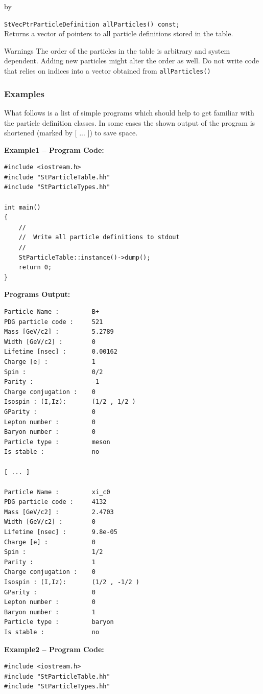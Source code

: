 \documentclass[twoside]{article}
\newcommand{\comp}[1]{\texttt{#1}}%
\newcommand{\entrylabel}[1]{\mbox{\textbf{{#1}}}\hfil}%
\newenvironment{entry}
{\begin{list}{}%
    {\renewcommand{\makelabel}{\entrylabel}%
     \setlength{\labelwidth}{90pt}%
     \setlength{\leftmargin}{\labelwidth}
     \advance\leftmargin by \labelsep%
      }%
    }%
  {\end{list}}
\newcommand{\Entrylabel}[1]%
{\raisebox{0pt}[1ex][0pt]{\makebox[\labelwidth][l]%
    {\parbox[t]{\labelwidth}{\hspace{0pt}\textbf{{#1}}}}}}
\newenvironment{Entry}%
{\renewcommand{\entrylabel}{\Entrylabel}\begin{entry}}%
  {\end{entry}}
\begin{document}
\begin{description}
\begin{Entry}
    \verb+StVecPtrParticleDefinition allParticles() const;+\\
    Returns a vector of pointers to all particle definitions stored
    in the table.

\item[Warnings]
    The order of the particles in the table is arbitrary and
    system dependent. Adding new particles might alter
    the order as well. Do not write code that relies on indices
    into a vector obtained from \comp{allParticles()}
\end{Entry}

\subsubsection{Examples}
\label{sec:pex}
What follows is a list of simple programs which should help to get familiar
with the particle definition classes. In some cases the shown
output of the program is shortened (marked by [ ... ]) to save space.

{\footnotesize
{\bf Example1 -- Program Code:}  
\begin{verbatim}
#include <iostream.h>
#include "StParticleTable.hh"
#include "StParticleTypes.hh"

int main()
{
    //
    //  Write all particle definitions to stdout
    //
    StParticleTable::instance()->dump();
    return 0;
}
\end{verbatim}
{\bf Programs Output:}
\begin{verbatim}
Particle Name :         B+
PDG particle code :     521
Mass [GeV/c2] :         5.2789
Width [GeV/c2] :        0
Lifetime [nsec] :       0.00162
Charge [e] :            1
Spin :                  0/2
Parity :                -1
Charge conjugation :    0
Isospin : (I,Iz):       (1/2 , 1/2 ) 
GParity :               0
Lepton number :         0
Baryon number :         0
Particle type :         meson
Is stable :             no

[ ... ]

Particle Name :         xi_c0
PDG particle code :     4132
Mass [GeV/c2] :         2.4703
Width [GeV/c2] :        0
Lifetime [nsec] :       9.8e-05
Charge [e] :            0
Spin :                  1/2
Parity :                1
Charge conjugation :    0
Isospin : (I,Iz):       (1/2 , -1/2 ) 
GParity :               0
Lepton number :         0
Baryon number :         1
Particle type :         baryon
Is stable :             no
\end{verbatim}
{\bf Example2 -- Program Code:}  
\begin{verbatim}
#include <iostream.h>
#include "StParticleTable.hh"
#include "StParticleTypes.hh"


\end{verbatim}}
\end{description}
\end{document}
